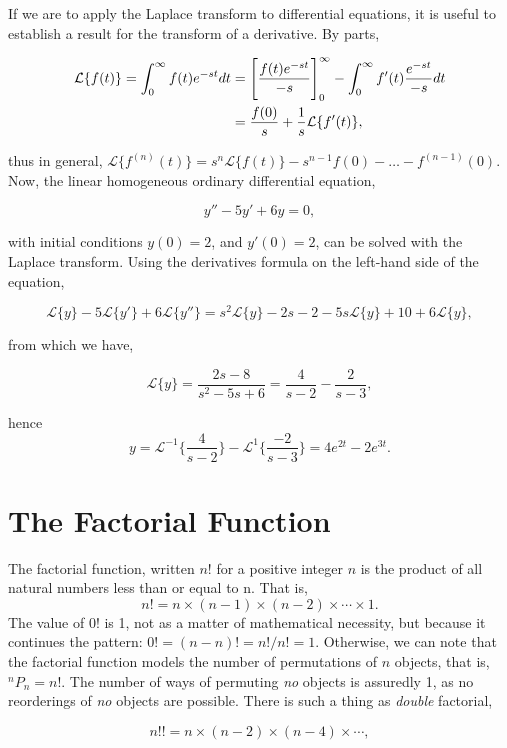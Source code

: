 \documentclass[11pt]{amsart}
\begin{document}
If we are to apply the Laplace transform to differential equations, it is useful to establish a result for the transform of a derivative. By parts,

\begin{align}
\mathcal{L}\{f(t)\} = \int_{0}^{\infty} f(t)e^{-st}dt &= \Bigg[\frac{f(t)e^{-st}}{-s}\Bigg]_0^{\infty} - \int_{0}^{\infty} f'(t)\frac{e^{-st}}{-s}dt \notag \\
&= \frac{f(0)}{s} + \frac{1}{s}\mathcal{L}\{f'(t)\} \notag,
\end{align}

thus in general, $\mathcal{L}\{f^{(n)}(t)\} = s^n \mathcal{L}\{f(t)\} - s^{n-1}f(0) - \dots - f^{(n-1)}(0)$. Now, the linear homogeneous ordinary differential equation,

$$y'' - 5y' + 6y = 0,$$

with initial conditions $y(0) = 2$, and $y'(0) = 2$, can be solved with the Laplace transform. Using the derivatives formula on the left-hand side of the equation,

$$\mathcal{L}\{y\} - 5\mathcal{L}\{y'\} + 6\mathcal{L}\{y''\} = s^2\mathcal{L}\{y\} - 2s - 2 - 5s\mathcal{L}\{y\} +10 + 6\mathcal{L}\{y\},$$

from which we have,

$$\mathcal{L}\{y\} = \frac{2s - 8}{s^2 - 5s + 6} = \frac{4}{s - 2} - \frac{2}{s - 3},$$

hence $$y = \mathcal{L}^{-1}\bigg\{\frac{4}{s - 2}\bigg\} - \mathcal{L}^{1}\bigg\{\frac{-2}{s - 3}\bigg\} = 4e^{2t} - 2e^{3t}.$$

\section{The Factorial Function}

The factorial function, written $n!$ for a positive integer $n$ is the product of all natural numbers less than or equal to n. That is, $$n! = n \times (n - 1) \times (n - 2) \times \cdots \times 1.$$ The value of $0!$ is 1, not as a matter of mathematical necessity, but because it continues the pattern: $0! = (n - n)! = n!/n! = 1$. Otherwise, we can note that the factorial function models the number of permutations of $n$ objects, that is, $^nP_n = n!$. The number of ways of permuting \emph{no} objects is assuredly 1, as no reorderings of \emph{no} objects are possible. There is such a thing as \emph{double} factorial,

$$n!! = n \times (n - 2) \times (n - 4) \times \cdots,$$
\end{document}
